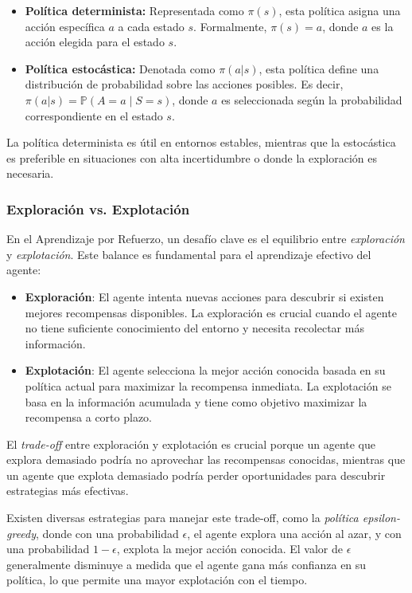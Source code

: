 \documentclass[a4paper,12pt, twoside]{report}
\begin{document}
\begin{itemize}
    \item \textbf{Política determinista:} Representada como $\pi(s)$, esta política asigna una acción específica $a$ a cada estado $s$. Formalmente, $\pi(s) = a$, donde $a$ es la acción elegida para el estado $s$.

    \item \textbf{Política estocástica:} Denotada como $\pi(a|s)$, esta política define una distribución de probabilidad sobre las acciones posibles. Es decir, $\pi(a|s) = \mathbb{P}(A = a \mid S = s)$, donde $a$ es seleccionada según la probabilidad correspondiente en el estado $s$.
\end{itemize}

La política determinista es útil en entornos estables, mientras que la estocástica es preferible en situaciones con alta incertidumbre o donde la exploración es necesaria.


\subsubsection{Exploración vs. Explotación}

En el Aprendizaje por Refuerzo, un desafío clave es el equilibrio entre \textit{exploración} y 
\textit{explotación}. Este balance es fundamental para el aprendizaje efectivo del agente:

\begin{itemize}
    \item \textbf{Exploración}: El agente intenta nuevas acciones para descubrir si existen mejores 
    recompensas disponibles. La exploración es crucial cuando el agente no tiene suficiente conocimiento 
    del entorno y necesita recolectar más información.
    \item \textbf{Explotación}: El agente selecciona la mejor acción conocida basada en su 
    política actual para maximizar la recompensa inmediata. La explotación se basa en la información 
    acumulada y tiene como objetivo maximizar la recompensa a corto plazo.
\end{itemize}

El \textit{trade-off} entre exploración y explotación es crucial porque un agente que explora 
demasiado podría no aprovechar las recompensas conocidas, mientras que un agente que explota 
demasiado podría perder oportunidades para descubrir estrategias más efectivas. 

Existen diversas estrategias para manejar este trade-off, como la \textit{política epsilon-greedy}, 
donde con una probabilidad \(\epsilon\), el agente explora una acción al azar, y con 
una probabilidad \(1-\epsilon\), explota la mejor acción conocida. El valor de \(\epsilon\) 
generalmente disminuye a medida que el agente gana más confianza en su política, lo que permite 
una mayor explotación con el tiempo.
\end{document}
